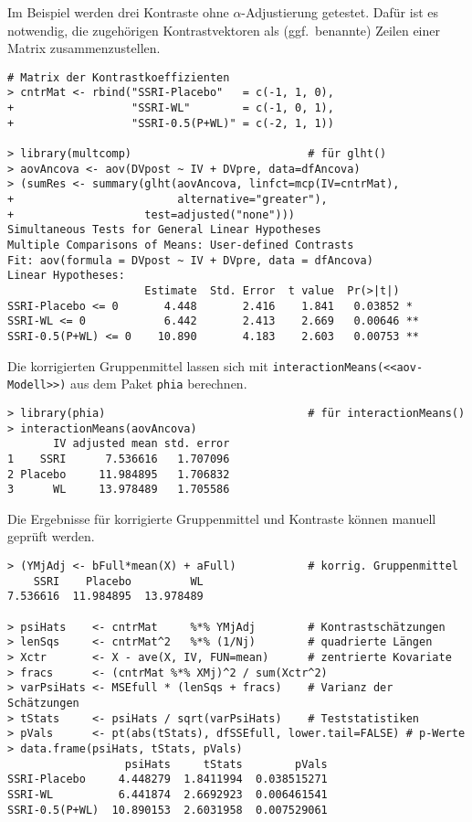 Im Beispiel werden drei Kontraste ohne $\alpha$-Adjustierung getestet. Dafür ist es notwendig, die zugehörigen Kontrastvektoren als (ggf.\ benannte) Zeilen einer Matrix zusammenzustellen.
\begin{lstlisting}
# Matrix der Kontrastkoeffizienten
> cntrMat <- rbind("SSRI-Placebo"   = c(-1, 1, 0),
+                  "SSRI-WL"        = c(-1, 0, 1),
+                  "SSRI-0.5(P+WL)" = c(-2, 1, 1))

> library(multcomp)                           # für glht()
> aovAncova <- aov(DVpost ~ IV + DVpre, data=dfAncova)
> (sumRes <- summary(glht(aovAncova, linfct=mcp(IV=cntrMat),
+                         alternative="greater"),
+                    test=adjusted("none")))
Simultaneous Tests for General Linear Hypotheses
Multiple Comparisons of Means: User-defined Contrasts
Fit: aov(formula = DVpost ~ IV + DVpre, data = dfAncova)
Linear Hypotheses:
                     Estimate  Std. Error  t value  Pr(>|t|)
SSRI-Placebo <= 0       4.448       2.416    1.841   0.03852 *
SSRI-WL <= 0            6.442       2.413    2.669   0.00646 **
SSRI-0.5(P+WL) <= 0    10.890       4.183    2.603   0.00753 **
\end{lstlisting}

Die korrigierten Gruppenmittel lassen sich mit \lstinline!interactionMeans(<<aov-Modell>>)! aus dem Paket \lstinline!phia! berechnen.
\begin{lstlisting}
> library(phia)                               # für interactionMeans()
> interactionMeans(aovAncova)
       IV adjusted mean std. error
1    SSRI      7.536616   1.707096
2 Placebo     11.984895   1.706832
3      WL     13.978489   1.705586
\end{lstlisting}

Die Ergebnisse für korrigierte Gruppenmittel und Kontraste können manuell geprüft werden.
\begin{lstlisting}
> (YMjAdj <- bFull*mean(X) + aFull)           # korrig. Gruppenmittel
    SSRI    Placebo         WL 
7.536616  11.984895  13.978489

> psiHats    <- cntrMat     %*% YMjAdj        # Kontrastschätzungen
> lenSqs     <- cntrMat^2   %*% (1/Nj)        # quadrierte Längen
> Xctr       <- X - ave(X, IV, FUN=mean)      # zentrierte Kovariate
> fracs      <- (cntrMat %*% XMj)^2 / sum(Xctr^2)
> varPsiHats <- MSEfull * (lenSqs + fracs)    # Varianz der Schätzungen
> tStats     <- psiHats / sqrt(varPsiHats)    # Teststatistiken
> pVals      <- pt(abs(tStats), dfSSEfull, lower.tail=FALSE) # p-Werte
> data.frame(psiHats, tStats, pVals)
                  psiHats     tStats        pVals
SSRI-Placebo     4.448279  1.8411994  0.038515271
SSRI-WL          6.441874  2.6692923  0.006461541
SSRI-0.5(P+WL)  10.890153  2.6031958  0.007529061
\end{lstlisting}

